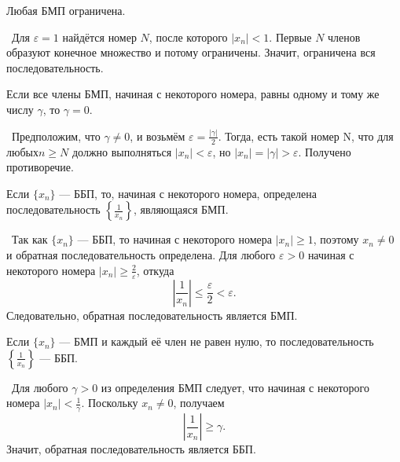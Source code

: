 \begin{theorem}
    Любая БМП ограничена.

    \vspace{2mm}

    \proofname~Для \(\varepsilon=1\) найдётся номер \(N\), после которого
    \(|x_{n}|<1\). Первые \(N\) членов образуют конечное множество и
    потому ограничены. Значит, ограничена вся последовательность.~\qedsymbol
\end{theorem}

\begin{theorem}
    Если все члены БМП, начиная с некоторого номера, равны одному и тому же
    числу \(\gamma\), то \(\gamma=0\).

    \vspace{2mm}

    \proofname~Предположим, что \(\gamma\neq 0\), и возьмём
    \(\varepsilon=\frac{|\gamma|}{2}\). Тогда, есть такой номер N,
    что для любых\(n\geq N\) должно выполняться \(|x_{n}|<\varepsilon\), но
    \(|x_{n}|=|\gamma|>\varepsilon\). Получено противоречие.~\qedsymbol
\end{theorem}

\begin{theorem}
    Если \(\{x_{n}\}\) --- ББП, то, начиная с некоторого номера, определена
    последовательность \(\left\{\frac{1}{x_{n}}\right\}\), являющаяся БМП.

    \vspace{2mm}

    \proofname~Так как \(\{x_{n}\}\) --- ББП, то начиная с некоторого
    номера \(|x_{n}|\geq1\), поэтому \(x_{n}\neq 0\) и обратная
    последовательность определена. Для любого \(\varepsilon>0\) начиная
    с некоторого номера \(|x_{n}|\geq\frac{2}{\varepsilon}\), откуда
    \[\left|\frac{1}{x_{n}}\right|\leq\frac{\varepsilon}{2}<\varepsilon.\]
    Следовательно, обратная последовательность является БМП.~\qedsymbol
\end{theorem}

\begin{theorem}
    Если \(\{x_{n}\}\) --- БМП и каждый её член не равен нулю, то
    последовательность \(\left\{\frac{1}{x_{n}}\right\}\) --- ББП.

    \vspace{2mm}

    \proofname~Для любого \(\gamma>0\) из определения БМП следует, что начиная
    с некоторого номера \(|x_{n}|<\frac{1}{\gamma}\). Поскольку \(x_{n}\neq 0\),
    получаем
    \[\left|\frac{1}{x_{n}}\right|\geq\gamma.\]
    Значит, обратная последовательность является ББП.~\qedsymbol
\end{theorem}

